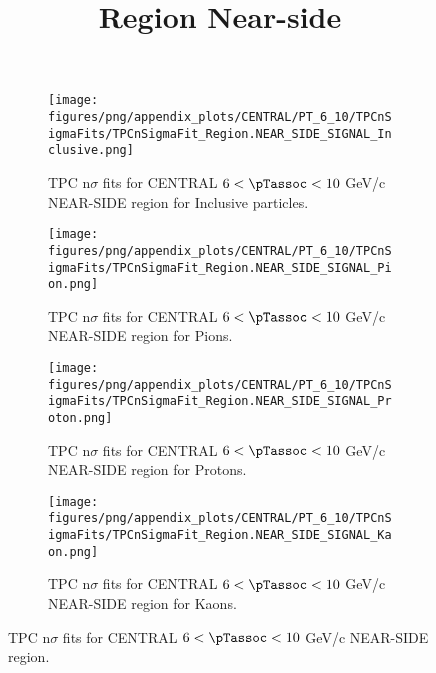             \begin{figure}[H]
                \title{Region Near-side}
                \begin{subfigure}[b]{0.5\textwidth}
                    \centering
                    \texttt{[image: figures/png/appendix\_plots/CENTRAL/PT\_6\_10/TPCnSigmaFits/TPCnSigmaFit\_Region.NEAR\_SIDE\_SIGNAL\_Inclusive.png]}
                    \caption{TPC n$\sigma$ fits for CENTRAL $6 < \pTassoc < 10$ GeV/c NEAR-SIDE region for Inclusive particles.}
                    \label{fig:appendix_CENTRAL_$6 < \pTassoc < 10$ GeV/c_NEAR_SIDE_SIGNAL_Inclusive}
                \end{subfigure}
                \begin{subfigure}[b]{0.5\textwidth}
                    \centering
                    \texttt{[image: figures/png/appendix\_plots/CENTRAL/PT\_6\_10/TPCnSigmaFits/TPCnSigmaFit\_Region.NEAR\_SIDE\_SIGNAL\_Pion.png]}
                    \caption{TPC n$\sigma$ fits for CENTRAL $6 < \pTassoc < 10$ GeV/c NEAR-SIDE region for Pions.}
                    \label{fig:appendix_CENTRAL_$6 < \pTassoc < 10$ GeV/c_NEAR_SIDE_SIGNAL_Pion}
                \end{subfigure}
                \begin{subfigure}[b]{0.5\textwidth}
                    \centering
                    \texttt{[image: figures/png/appendix\_plots/CENTRAL/PT\_6\_10/TPCnSigmaFits/TPCnSigmaFit\_Region.NEAR\_SIDE\_SIGNAL\_Proton.png]}
                    \caption{TPC n$\sigma$ fits for CENTRAL $6 < \pTassoc < 10$ GeV/c NEAR-SIDE region for Protons.}
                    \label{fig:appendix_CENTRAL_$6 < \pTassoc < 10$ GeV/c_NEAR_SIDE_SIGNAL_Proton}
                \end{subfigure}
                \begin{subfigure}[b]{0.5\textwidth}
                    \centering
                    \texttt{[image: figures/png/appendix\_plots/CENTRAL/PT\_6\_10/TPCnSigmaFits/TPCnSigmaFit\_Region.NEAR\_SIDE\_SIGNAL\_Kaon.png]}
                    \caption{TPC n$\sigma$ fits for CENTRAL $6 < \pTassoc < 10$ GeV/c NEAR-SIDE region for Kaons.}
                    \label{fig:appendix_CENTRAL_$6 < \pTassoc < 10$ GeV/c_NEAR_SIDE_SIGNAL_Kaon}
                \end{subfigure}
                \caption{TPC n$\sigma$ fits for CENTRAL $6 < \pTassoc < 10$ GeV/c NEAR-SIDE region.}
                \label{fig:appendix_CENTRAL_$6 < \pTassoc < 10$ GeV/c_NEAR_SIDE_SIGNAL}
            \end{figure}
